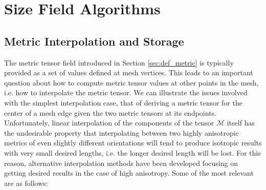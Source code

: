 \section{Size Field Algorithms}
\label{sec:sf}

\subsection{Metric Interpolation and Storage}
\label{sec:metric_interp}

The metric tensor field introduced in Section \ref{sec:def_metric}
is typically provided as a set of values defined at mesh vertices.
This leads to an important question about how to compute metric
tensor values at other points in the mesh, i.e. how to interpolate
the metric tensor.
We can illustrate the issues involved with the simplest interpolation
case, that of deriving a metric tensor for the center of a mesh
edge given the two metric tensors at its endpoints.
Unfortunately, linear interpolation of the components of the
tensor $\mathcal{M}$ itself has the undesirable property that
interpolating between two highly anisotropic metrics of even
slightly different orientations will tend to produce isotropic
results with very small desired lengths, i.e. the longer desired
length will be lost.
For this reason, alternative interpolation methods have been developed
focusing on getting desired results in the case of high anisotropy.
Some of the most relevant are as follows:

